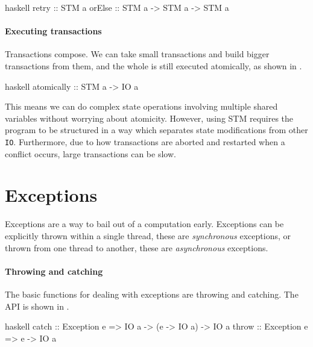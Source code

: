 \begin{listing}
\centering
\begin{cminted}{haskell}
retry  :: STM a
orElse :: STM a -> STM a -> STM a
\end{cminted}
\caption{Aborting and retrying transactions in Haskell.}\label{lst:orelse_haskell}
\end{listing}

\paragraph{Executing transactions}
Transactions compose.  We can take small transactions and build bigger
transactions from them, and the whole is still executed atomically, as
shown in .

\begin{listing}
\centering
\begin{cminted}{haskell}
atomically :: STM a -> IO a
\end{cminted}
\caption{Executing transactions in Haskell.}\label{lst:atomically_haskell}
\end{listing}

This means we can do complex state operations involving multiple
shared variables without worrying about atomicity.  However, using STM
requires the program to be structured in a way which separates state
modifications from other \verb|IO|.  Furthermore, due to how
transactions are aborted and restarted when a conflict occurs, large
transactions can be slow\cite{le2015}.

\section{Exceptions}
\label{sec:concurrent_haskell-exc}

Exceptions are a way to bail out of a computation early.  Exceptions can be
explicitly thrown within a single thread, these are \emph{synchronous}
exceptions, or thrown from one thread to another, these are \emph{asynchronous}
exceptions.

\paragraph{Throwing and catching}
The basic functions for dealing with exceptions are throwing and
catching.  The API is shown in .

\begin{listing}
\centering
\begin{cminted}{haskell}
catch :: Exception e => IO a -> (e -> IO a) -> IO a
throw :: Exception e => e -> IO a
\end{cminted}
\caption{Exceptions in Haskell.}\label{lst:excs_haskell}
\end{listing}


